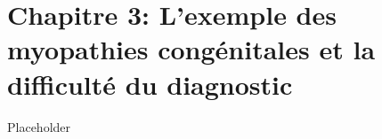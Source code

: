 \chapter*{Chapitre 3: L’exemple des myopathies congénitales et la difficulté du diagnostic}
Placeholder